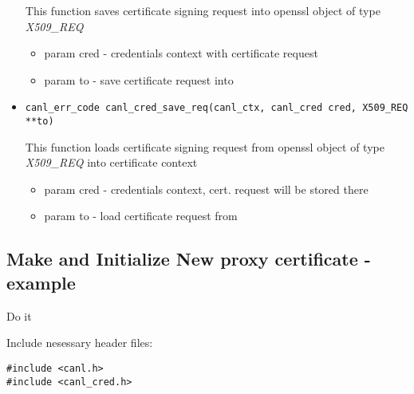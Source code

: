 \begin{itemize}
  This function saves certificate signing request into openssl object of type \textit{X509\_REQ}
  \begin{itemize}
    \item param cred - credentials context with certificate request
    \item param to - save certificate request into
  \end{itemize}
  \item \begin{verbatim}
canl_err_code canl_cred_save_req(canl_ctx, canl_cred cred, X509_REQ **to)\end{verbatim}
  This function loads certificate signing request from openssl object of type \textit{X509\_REQ} into \CANL certificate context
  \begin{itemize}
    \item param cred - credentials context, cert. request will be stored there
    \item param to - load certificate request from
  \end{itemize}

\end{itemize}

\subsection{Make and Initialize New proxy certificate - example}
\TODO Do it

Include nesessary header files:
\begin{lstlisting}
#include <canl.h>
#include <canl_cred.h>
\end{lstlisting}


